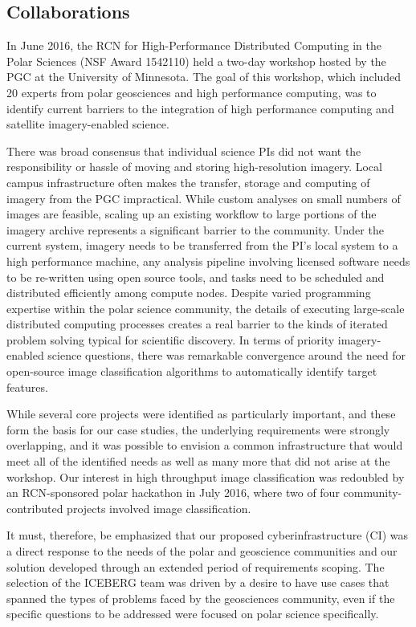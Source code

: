\documentclass[manuscript,screen]{acmart}
\begin{document}
\subsection{Collaborations}
In June 2016, the RCN for High-Performance Distributed Computing in the Polar Sciences (NSF Award 1542110) held a two-day workshop hosted by the PGC at the University of Minnesota. The goal of this workshop, which included 20 experts from polar geosciences and high performance computing, was to identify current barriers to the integration of high performance computing and satellite imagery-enabled science. 

There was broad consensus that individual science PIs did not want the 
responsibility or hassle of moving and storing high-resolution imagery. 
Local campus infrastructure often makes the transfer, storage and computing of imagery from the PGC impractical. While custom analyses on small numbers of images are feasible, scaling up an existing workflow to large portions of the imagery archive represents a significant barrier to the community. Under 
the current system, imagery needs to be transferred from the PI’s local system to a high performance machine, any analysis pipeline involving licensed software needs to be re-written using open source tools, and tasks need to be scheduled and distributed efficiently among compute nodes. 
Despite varied programming expertise within the polar science community, the details of executing large-scale distributed computing processes creates a real barrier to the kinds of iterated problem solving typical for scientific discovery. In terms of priority imagery-enabled science questions, there was remarkable convergence around the need for open-source image classification algorithms to automatically identify target features. 

While several core projects were identified as particularly important, and these form the basis for our case studies, the underlying requirements were strongly overlapping, and it was possible to envision a common infrastructure that would meet all of the identified needs as well as many more that did not arise at the workshop. Our interest in high throughput image classification was redoubled by an RCN-sponsored polar hackathon in July 2016, where two of four community-contributed projects involved image classification. 

It must, therefore, be emphasized that our proposed cyberinfrastructure (CI) was a direct response to the needs of the polar and geoscience communities and our solution developed through an extended period of requirements scoping. The selection of the ICEBERG team was driven by a desire to have use cases that spanned the types of problems faced by the geosciences community, even if the specific questions to be addressed were focused on polar science specifically. 
\end{document}
